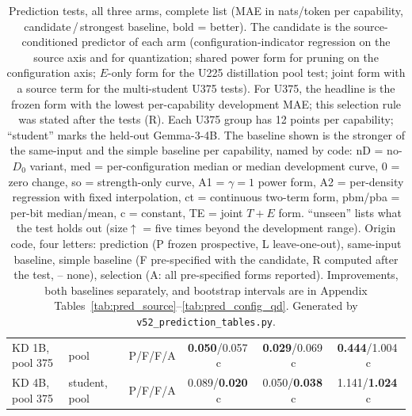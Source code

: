 \begin{table}[H]
\begin{tabular}{@{}>{\raggedright\arraybackslash}p{4.15cm}>{\raggedright\arraybackslash}p{1.4cm}lccc@{}}
KD 1B, pool 375 & pool & P/F/F/A & \textbf{0.050}/0.057{\scriptsize\,c} & \textbf{0.029}/0.069{\scriptsize\,c} & \textbf{0.444}/1.004{\scriptsize\,c} \\
KD 4B, pool 375 & student, pool & P/F/F/A & 0.089/\textbf{0.020}{\scriptsize\,c} & 0.050/\textbf{0.038}{\scriptsize\,c} & 1.141/\textbf{1.024}{\scriptsize\,c} \\
\bottomrule\end{tabular}
\caption{\scriptsize Prediction tests, all three arms, complete list (MAE in nats/token per capability, candidate\,/\,strongest baseline, bold = better). The candidate is the source-conditioned predictor of each arm (configuration-indicator regression on the source axis and for quantization; shared power form for pruning on the configuration axis; $E$-only form for the U225 distillation pool test; joint form with a source term for the multi-student U375 tests). For U375, the headline is the frozen form with the lowest per-capability development MAE; this selection rule was stated after the tests (R). Each U375 group has 12 points per capability; ``student'' marks the held-out Gemma-3-4B. The baseline shown is the stronger of the same-input and the simple baseline per capability, named by code: nD = no-$D_0$ variant, med = per-configuration median or median development curve, 0 = zero change, so = strength-only curve, A1 = $\gamma{=}1$ power form, A2 = per-density regression with fixed interpolation, ct = continuous two-term form, pbm/pba = per-bit median/mean, c = constant, TE = joint $T{+}E$ form. ``unseen'' lists what the test holds out (size$\uparrow$ = five times beyond the development range). Origin code, four letters: prediction (P frozen prospective, L leave-one-out), same-input baseline, simple baseline (F pre-specified with the candidate, R computed after the test, -- none), selection (A: all pre-specified forms reported). Improvements, both baselines separately, and bootstrap intervals are in Appendix Tables~\ref{tab:pred_source}--\ref{tab:pred_config_qd}. Generated by \texttt{v52\_prediction\_tables.py}.}
\label{tab:pred_full}\end{table}
